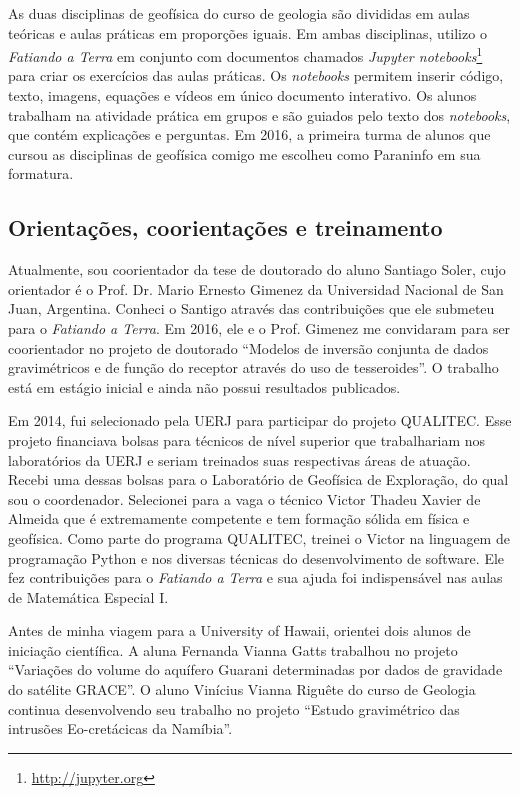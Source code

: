 As duas disciplinas de geofísica do curso de geologia são divididas em aulas
teóricas e aulas práticas em proporções iguais.
Em ambas disciplinas, utilizo o \textit{Fatiando a Terra} em conjunto com
documentos chamados \textit{Jupyter
notebooks}\footnote{\url{http://jupyter.org}} para criar os exercícios das
aulas práticas.
Os \textit{notebooks} permitem inserir código, texto, imagens, equações e
vídeos em único documento interativo.
Os alunos trabalham na atividade prática em grupos e são guiados pelo texto dos
\textit{notebooks}, que contém explicações e perguntas.
Em 2016, a primeira turma de alunos que cursou as disciplinas de geofísica
comigo me escolheu como Paraninfo em sua formatura.



\subsection{Orientações, coorientações e treinamento}

Atualmente, sou coorientador da tese de doutorado do aluno Santiago Soler, cujo
orientador é o Prof. Dr. Mario Ernesto Gimenez da Universidad Nacional de San
Juan, Argentina.
Conheci o Santigo através das contribuições que ele submeteu para o
\textit{Fatiando a Terra}.
Em 2016, ele e o Prof. Gimenez me convidaram para ser coorientador no projeto
de doutorado ``Modelos de inversão conjunta de dados gravimétricos e de função
do receptor através do uso de tesseroides''.
O trabalho está em estágio inicial e ainda não possui resultados publicados.

Em 2014, fui selecionado pela UERJ para participar do projeto QUALITEC.
Esse projeto financiava bolsas para técnicos de nível superior que trabalhariam
nos laboratórios da UERJ e seriam treinados suas respectivas áreas de atuação.
Recebi uma dessas bolsas para o Laboratório de Geofísica de Exploração, do qual
sou o coordenador.
Selecionei para a vaga o técnico Victor Thadeu Xavier de Almeida que é
extremamente competente e tem formação sólida em física e geofísica.
Como parte do programa QUALITEC, treinei o Victor na linguagem de programação
Python e nos diversas técnicas do desenvolvimento de software.
Ele fez contribuições para o \textit{Fatiando a Terra} e sua ajuda foi
indispensável nas aulas de Matemática Especial I.

Antes de minha viagem para a University of Hawaii, orientei dois alunos de
iniciação científica.
A aluna Fernanda Vianna Gatts trabalhou no projeto ``Variações do volume do
aquífero Guarani determinadas por dados de gravidade do satélite GRACE''.
O aluno Vinícius Vianna Riguête do curso de Geologia continua desenvolvendo seu
trabalho no projeto ``Estudo gravimétrico das intrusões
Eo-cretácicas da Namíbia''.
